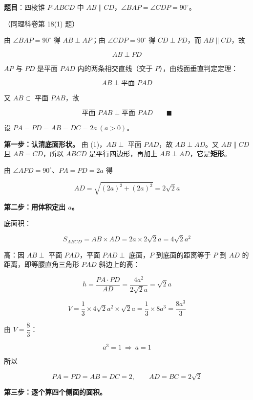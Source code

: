 \par\medskip


\textbf{题目}：四棱锥 $P\text{-}ABCD$ 中 $AB\parallel CD$，$\angle BAP=\angle CDP=90^\circ$。

\begin{center}\end{center}


（同理科卷第 18(1) 题）

由 $\angle BAP=90^\circ$ 得 $AB\perp AP$；由 $\angle CDP=90^\circ$ 得 $CD\perp PD$，而 $AB\parallel CD$，故

\[AB\perp PD\]

$AP$ 与 $PD$ 是平面 $PAD$ 内的两条相交直线（交于 $P$），由线面垂直判定定理：

\[AB\perp\text{平面 }PAD\]

又 $AB\subset$ 平面 $PAB$，故

\[\text{平面 }PAB\perp\text{平面 }PAD\qquad\blacksquare\]


设 $PA=PD=AB=DC=2a\ (a>0)$。

\textbf{第一步：认清底面形状。} 由 (1)，$AB\perp$ 平面 $PAD$，故 $AB\perp AD$。又 $AB\parallel CD$ 且 $AB=CD$，所以 $ABCD$ 是平行四边形，再加上 $AB\perp AD$，它是\textbf{矩形}。

由 $\angle APD=90^\circ$、$PA=PD=2a$ 得

\[AD=\sqrt{(2a)^{2}+(2a)^{2}}=2\sqrt2a\]

\textbf{第二步：用体积定出 $a$。}

底面积：

\[S_{ABCD}=AB\times AD=2a\times2\sqrt2a=4\sqrt2a^{2}\]

高：因 $AB\perp$ 平面 $PAD$，平面 $PAD\perp$ 底面，$P$ 到底面的距离等于 $P$ 到 $AD$ 的距离，即等腰直角三角形 $PAD$ 斜边上的高：

\[h=\frac{PA\cdot PD}{AD}=\frac{4a^{2}}{2\sqrt2a}=\sqrt2a\]

\[V=\frac13\times4\sqrt2a^{2}\times\sqrt2a=\frac13\times8a^{3}=\frac{8a^{3}}3\]

由 $V=\dfrac83$：

\[a^{3}=1\ \Longrightarrow\ a=1\]

所以

\[PA=PD=AB=DC=2,\qquad AD=BC=2\sqrt2\]

\textbf{第三步：逐个算四个侧面的面积。}


